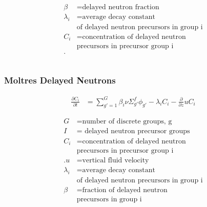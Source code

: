 \begin{frame}
\begin{columns}
\begin{column}{0.48\textwidth}
{\begin{align*}
                \beta &= \mbox{delayed neutron fraction}\\
                \lambda_i &= \mbox{average decay constant}\\
                &\mbox{of delayed neutron precursors in group i} \\
                C_i &= \mbox{concentration of delayed neutron}\\
                &\mbox{precursors in precursor group i}\\.
        \end{align*}}
    \end{column}
\end{columns}
\end{frame}

\begin{frame}
        \frametitle{Moltres Delayed Neutrons}
        \begin{align}
        \frac{\partial C_i}{\partial t} &= \sum_{g'= 1}^G \beta_i \nu
        \Sigma_{g'}^f \phi_{g'} - \lambda_i C_i - \frac{\partial}{\partial z} u
        C_i \label{eq:precursors}
\end{align}

        \begin{align*}
                G &= \mbox{number of discrete groups, g} \\
                I &= \mbox{ delayed neutron precursor groups} \\
                C_i &= \mbox{concentration of delayed neutron}\\
                &\mbox{precursors in precursor group i}\\.
                u &= \mbox{vertical fluid velocity}\\
                \lambda_i &= \mbox{average decay constant}\\
                &\mbox{of delayed neutron precursors in group i} \\
                \beta &= \mbox{fraction of delayed neutron}\\
                &\mbox{precursors in group i} \\
        \end{align*}
\end{frame}


